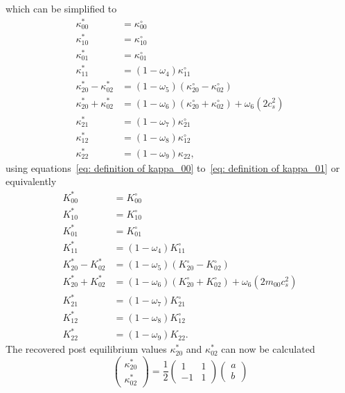 which can be simplified to
\begin{equation}
  \label{eq: collision final before simplification}
  \begin{aligned}
    \kappa_{00}^{*} & = \kappa_{00}^{\circ}\\
    \kappa_{10}^{*} & = \kappa_{10}^{\circ}\\
    \kappa_{01}^{*} & = \kappa_{01}^{\circ}\\
    \kappa_{11}^{*} & = (1-\omega_4)\kappa_{11}^{\circ}\\
    \kappa_{20}^{*} - \kappa_{02}^{*}
      & = (1-\omega_5) (\kappa_{20}^{\circ}- \kappa_{02}^{\circ}) \\
    \kappa_{20}^{*} + \kappa_{02}^{*}
      & = (1-\omega_6)(\kappa_{20}^{\circ}+ \kappa_{02}^{\circ}) + \omega_6 \left( 2 c_s^2 \right) \\
    \kappa_{21}^{*} & = (1-\omega_7)\kappa_{21}^{\circ}\\
    \kappa_{12}^{*} & = (1-\omega_8)\kappa_{12}^{\circ}\\
    \kappa_{22}^{*} & = (1-\omega_9)\kappa_{22},
  \end{aligned}
\end{equation}
using equations~\eqref{eq: definition of kappa_00} to~\eqref{eq: definition of kappa_01} or equivalently
\begin{equation}
  \label{eq: collision final before simplification normalized}
  \begin{aligned}
    K_{00}^{*} & = K_{00}^{\circ}\\
    K_{10}^{*} & = K_{10}^{\circ}\\
    K_{01}^{*} & = K_{01}^{\circ}\\
    K_{11}^{*} & = (1-\omega_4)K_{11}^{\circ}\\
    K_{20}^{*} - K_{02}^{*}
      & = (1-\omega_5) (K_{20}^{\circ}- K_{02}^{\circ}) \\
    K_{20}^{*} + K_{02}^{*}
      & = (1-\omega_6)(K_{20}^{\circ}+ K_{02}^{\circ}) + \omega_6 \left( 2 m_{00} c_s^2 \right) \\
    K_{21}^{*} & = (1-\omega_7)K_{21}^{\circ}\\
    K_{12}^{*} & = (1-\omega_8)K_{12}^{\circ}\\
    K_{22}^{*} & = (1-\omega_9)K_{22}.
  \end{aligned}
\end{equation}
The recovered post equilibrium values $\kappa_{20}^{*}$ and $\kappa_{02}^{*}$ can now be calculated
\begin{equation*}
  \begin{pmatrix}
    \kappa_{20}^{*} \\
    \kappa_{02}^{*}
  \end{pmatrix}
  = \frac{1}{2}
  \begin{pmatrix}
    1 & 1 \\ -1 & 1
  \end{pmatrix}
  \begin{pmatrix}
    a\\
    b
  \end{pmatrix}
\end{equation*}
